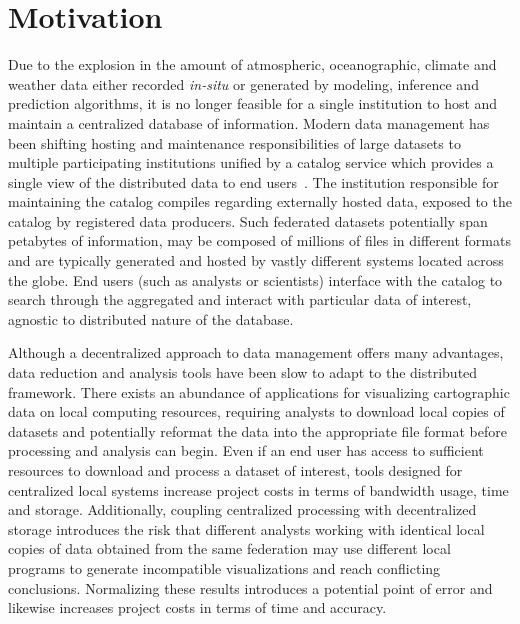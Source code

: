 \section{Motivation}
\label{sec:motivation}
Due to the explosion in the amount of atmospheric, oceanographic,
climate and weather data either recorded \emph{in-situ} or generated
by modeling, inference and prediction algorithms, it is no longer
feasible for a single institution to host and maintain a centralized
database of information. Modern data management has been shifting
hosting and maintenance responsibilities of large datasets to multiple
participating institutions unified by a catalog service which provides
a single view of the distributed data to end users~\cite{luettich13,
  williams09, chervenak00}. The institution responsible for
maintaining the catalog compiles \metadata{} regarding externally
hosted data, exposed to the catalog by registered data producers. Such
federated datasets potentially span petabytes of information, may be
composed of millions of files in different formats and are typically
generated and hosted by vastly different systems located across the
globe. End users (such as analysts or scientists) interface with the
catalog to search through the aggregated \metadata{} and interact with
particular data of interest, agnostic to distributed nature of the
database.

Although a decentralized approach to data management offers many
advantages, data reduction and analysis tools have been slow to adapt
to the distributed framework. There exists an abundance of
applications for visualizing cartographic data on local computing
resources, requiring analysts to download local copies of datasets
and potentially reformat the data into the appropriate file format
before processing and analysis can begin. Even if an end user has
access to sufficient resources to download and process a dataset of
interest, tools designed for centralized local systems increase
project costs in terms of bandwidth usage, time and
storage. Additionally, coupling centralized processing with
decentralized storage introduces the risk that different analysts
working with identical local copies of data obtained from the same
federation may use different local programs to generate incompatible
visualizations and reach conflicting conclusions. Normalizing these
results introduces a potential point of error and likewise increases
project costs in terms of time and accuracy.

